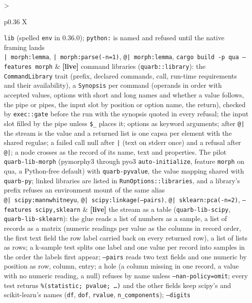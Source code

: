 \documentclass{report}
\newcommand{\live}{\textbf{\textcolor{blue!60!black}{[live]}}\xspace}
\begin{document}
\begin{xltabular}{\textwidth}{>{\raggedright\arraybackslash}p{0.36\textwidth} X}
    \texttt{lib} (spelled \texttt{env} in 0.36.0); \texttt{python:} is named and refused until the
    native framing lands \\
\texttt{| morph:lemma}, \texttt{| morph:parse(-n=1)},
\texttt{@| morph:lemma}, \texttt{cargo build -p qua --features morph}
  & \live command libraries (\texttt{quarb::library}): the
    \texttt{CommandLibrary} trait (prefix, declared commands, call,
    run-time requirements and their availability), a
    \texttt{Synopsis} per command (operands in order with accepted
    values, options with short and long names and whether a value
    follows, the pipe or pipes, the input slot by position or option
    name, the return), checked by \texttt{exec::gate} before the run
    with the synopsis quoted in every refusal; the input slot filled
    by the pipe unless \texttt{\$\_} places it; options as keyword
    arguments; after \texttt{@|} the stream is the value and a
    returned list is one capsa per element with the shared regulae;
    a failed call null after \texttt{|} (text on stderr once) and a
    refusal after \texttt{@|}; a node crosses as the record of its
    name, text and properties. The pilot \texttt{quarb-lib-morph}
    (pymorphy3 through pyo3 \texttt{auto-initialize}, feature
    \texttt{morph} on qua, a Python-free default) with
    \texttt{quarb-pyvalue}, the value mapping shared with
    \texttt{quarb-py}; linked libraries are listed in
    \texttt{RunOptions::libraries}, and a library's prefix refuses
    an environment mount of the same alias \\
\texttt{@| scipy:mannwhitneyu}, \texttt{@| scipy:linkage(--pairs)},
\texttt{@| sklearn:pca(-n=2)}, \texttt{--features scipy,sklearn}
  & \live the stream as a table (\texttt{quarb-lib-scipy},
    \texttt{quarb-lib-sklearn}): the glue reads a list of numbers as
    a sample, a list of records as a matrix (numeric readings per
    value as the columns in record order, the first text field the
    row label carried back on every returned row), a list of lists as
    rows; a k-sample test splits one label and one value per record
    into samples in the order the labels first appear; \texttt{--pairs}
    reads two text fields and one numeric by position as row, column,
    entry; a hole (a column missing in one record, a value with no
    numeric reading, a null) refuses by name unless
    \texttt{--nan-policy=omit}; every test returns
    \texttt{\%(statistic; pvalue; …)} and the other fields keep
    scipy's and scikit-learn's names (\texttt{df}, \texttt{dof},
    \texttt{rvalue}, \texttt{n\_components}); \texttt{--digits}

\end{xltabular}
\end{document}
